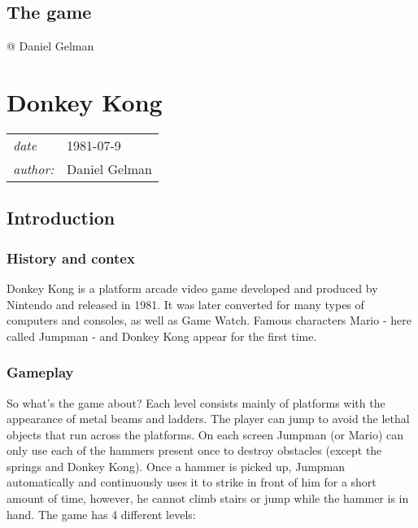 \documentclass[a4paper,10pt]{book}
\newcommand{\pageHeader}[4]{
    \section{#1}
    \vspace{-0.3cm}
    \begin{table}[h!]
     \begin{tabular}{ll}
        \hline
        \textit{date} & #2 \\
        \textit{author: } & #3\\
        \hline
     \end{tabular}
    \end{table}
    \vspace{-0.3cm}
}
\begin{document}
 
 \subsection{}
 \subsubsection{}
   \textbf{}   \textit{}
 
 \subsection{The game }
 
 
 
 
 @ Daniel Gelman 
 
 
 \newpage\pageHeader{Donkey Kong}{1981-07-9}{Daniel Gelman}{Donkey Kong is an arcade game released by Nintendo. A debut for Mario and a debut for Donkey, this game is just synonymous with famous. Prove me wrong.}
 \subsection{Introduction }
 \subsubsection{History and contex }
   \textbf{}   \textit{}
 
                Donkey Kong is a platform arcade video game developed and produced by Nintendo and released in 1981. It was later converted for many types of computers and consoles, as well as Game  Watch. Famous characters Mario - here called Jumpman - and Donkey Kong
                appear for the first time.
             
 \subsubsection{Gameplay }
   \textbf{}   \textit{}
 
                So what's the game about?   Each level consists mainly of platforms with the appearance of metal beams and ladders. The player can jump to avoid the lethal objects that run across the platforms. On each screen Jumpman (or Mario) can
                only use each of the hammers present once to destroy obstacles (except the springs and Donkey Kong). Once a hammer is picked up, Jumpman automatically and continuously uses it to strike in front of him for a short amount of time, however,
                he cannot climb stairs or jump while the hammer is in hand. The game has 4 different levels:
                 
\end{document}
